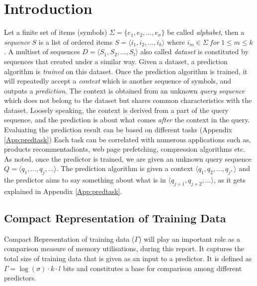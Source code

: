 \section{Introduction}
Let a finite set of items (symbols) \(\Sigma = \{e_1, e_2,\ldots,e_\sigma\}\) be called \emph{alphabet}, then a \emph{sequence} \(S\) is a list of ordered items \(S=\langle i_1,i_2,\ldots,i_k\rangle\) where \(i_m \in \Sigma\ for\ 1\leq m \leq k\). A multiset of sequences \(D = \langle S_1, S_2,\ldots,S_l\rangle\) also called \emph{dataset} is constituted by sequences that created under a similar way. Given a dataset, a prediction algorithm is \emph{trained} on this dataset.  Once the prediction algorithm is trained, it will repeatedly accept a \emph{context} which is another sequence of symbols, and outputs a \emph{prediction}. The context is obtained from an unknown \emph{query sequence} which does not belong to the dataset but shares common characteristics with the dataset.  Loosely speaking, the context is derived from a part of the query sequence, and the prediction is about what comes \emph{after} the context in the query. Evaluating the prediction result can be based on different tasks (Appendix \ref{App:predtask}) Each task can be correlated with numerous applications such as, products recommentadionts, web page prefetching, compression algorithms etc. As noted, once the predictor is trained, we are given an unknown query sequence \(Q = \langle q_1, \ldots, q_j, \ldots \rangle\).  The prediction algorithm is given a context \(\langle q_1, q_2,\ldots, q_j,\rangle\) and the predictor aims to say something about what is in \(\langle q_{j+1},q_{j+2},\ldots\rangle\), as it gets explained in Appendix \ref{App:predtask}.

\subsection*{Compact Representation of Training Data}
Compact Representation of training data (\(\Gamma\)) will play an important role as a comparison measure of memory utilisations, during this report. It captures the total size of training data that is given as an input to a predictor. It is defined as \(\Gamma = \log(\sigma) \cdot k \cdot l \) bits and constitutes a base for comparison among different predictors.

